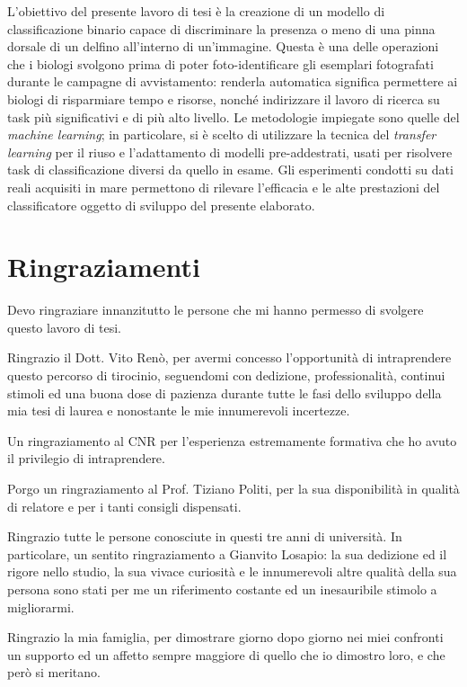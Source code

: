 \documentclass[a4paper,12pt,twoside]{book}
\begin{document}
L’obiettivo del presente lavoro di tesi è la creazione di un modello di classificazione binario capace di discriminare la presenza o meno di una pinna dorsale di un delfino all'interno di un'immagine. Questa è una delle operazioni che i biologi svolgono prima di poter foto-identificare gli esemplari fotografati durante le campagne di avvistamento: renderla automatica significa permettere ai biologi di risparmiare tempo e risorse, nonché indirizzare il lavoro di ricerca su task più significativi e di più alto livello.
Le metodologie impiegate sono quelle del \emph{machine learning}; in particolare, si è scelto di utilizzare la tecnica del \emph{transfer learning} per il riuso e l'adattamento di modelli pre-addestrati, usati per risolvere task di classificazione diversi da quello in esame.
Gli esperimenti condotti su dati reali acquisiti in mare permettono di rilevare l’efficacia e le alte prestazioni del classificatore oggetto di sviluppo del presente elaborato.

\chapter*{Ringraziamenti}
Devo ringraziare innanzitutto le persone che mi hanno permesso di svolgere questo lavoro di tesi.

Ringrazio il Dott. Vito Renò, per avermi concesso l'opportunità di intraprendere questo percorso di tirocinio, seguendomi con dedizione, professionalità, continui stimoli ed una buona dose di pazienza durante tutte le fasi dello sviluppo della mia tesi di laurea e nonostante le mie innumerevoli incertezze.

Un ringraziamento al CNR per l'esperienza estremamente formativa che ho avuto il privilegio di intraprendere.

Porgo un ringraziamento al Prof. Tiziano Politi, per la sua disponibilità in qualità di relatore e per i tanti consigli dispensati.

Ringrazio tutte le persone conosciute in questi tre anni di università. In particolare, un sentito ringraziamento a Gianvito Losapio: la sua dedizione ed il rigore nello studio, la sua vivace curiosità e le innumerevoli altre qualità della sua persona sono stati per me un riferimento costante ed un inesauribile stimolo a migliorarmi.

Ringrazio la mia famiglia, per dimostrare giorno dopo giorno nei miei confronti un supporto ed un affetto sempre maggiore di quello che io dimostro loro, e che però si meritano.
\end{document}
